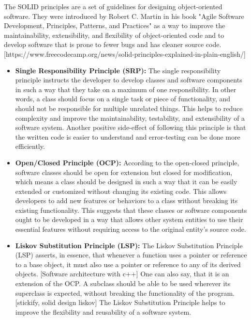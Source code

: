 The SOLID principles are a set of guidelines for designing object-oriented software. They were introduced by Robert C. Martin in his book "Agile Software Development, Principles, Patterns, and Practices" as a way to improve the maintainability, extensibility, and flexibility of object-oriented code and to develop software that is prone to fewer bugs and has cleaner source code. [https://www.freecodecamp.org/news/solid-principles-explained-in-plain-english/]
\begin{itemize}
	\item \textbf{Single Responsibility Principle (SRP):}
	The single responsibility principle instructs the developer to develop classes and software components in such a way that they take on a maximum of one responsibility. In other words, a class should focus on a single task or piece of functionality, and should not be responsible for multiple unrelated things. This helps to reduce complexity and improve the maintainability, testability, and extensibility of a software system. Another positive side-effect of following this principle is that the written code is easier to understand and error-testing can be done more efficiently.
	
	\item \textbf{Open/Closed Principle (OCP):}
	According to the open-closed principle, software classes should be open for extension but closed for modification, which means a class should be designed in such a way that it can be easily extended or customized without changing its existing code. This allows developers to add new features or behaviors to a class without breaking its existing functionality. This suggests that these classes or software components ought to be developed in a way that allows other system entities to use their essential features without requiring access to the original entity's source code. 
	
	\item \textbf{Liskov Substitution Principle (LSP):}
	The Liskov Substitution Principle (LSP) asserts, in essence, that whenever a function uses a pointer or reference to a base object, it must also use a pointer or reference to any of its derived objects. [Software architecture with c++] One can also say, that it is an extension of the OCP. A subclass should be able to be used wherever its superclass is expected, without breaking the functionality of the program. [stickify, solid design liskov] The Liskov Substitution Principle helps to improve the flexibility and reusability of a software system.
	

\end{itemize}
